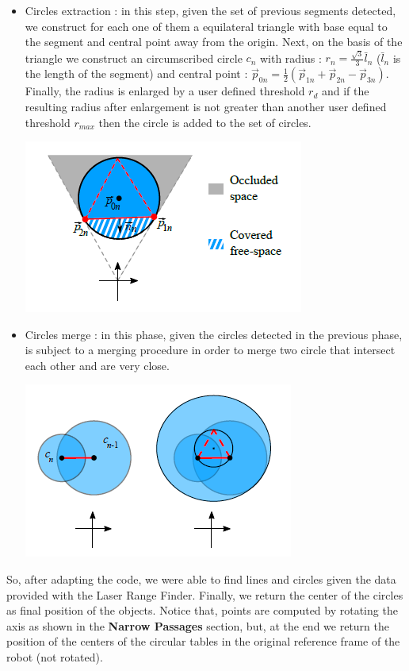 \begin{itemize}
    \item Circles extraction : in this step, given the set of previous segments detected, we construct for each one of them a equilateral triangle with base equal to the segment and central point away from the origin. Next, on the basis of the triangle we construct an circumscribed circle \(c_{n}\) with radius : \(r_{n} = \frac{\sqrt{3}}{3} \bar{l}_{n}\) (\(\bar{l}_{n}\) is the length of the segment) and central point : \(\vec{p}_{0n} = \frac{1}{2} (\vec{p}_{1n} + \vec{p}_{2n} - \vec{p}_{3n})\). Finally, the radius is enlarged by a user defined threshold \(r_{d}\) and if the resulting radius after enlargement is not greater than another user defined threshold \(r_{max}\) then the circle is added to the set of circles.
    \begin{center}
        \includegraphics[scale=0.75]{images/detection/circle-extraction.png}    
    \end{center}  
    \item Circles merge : in this phase, given the circles detected in the previous phase, is subject to a merging procedure in order to merge two circle that intersect each other and are very close.   
    \begin{center}
        \includegraphics[scale=0.75]{images/detection/circle-merging.png}    
    \end{center}  
\end{itemize}
So, after adapting the code, we were able to find lines and circles given the data provided with the Laser Range Finder. 
\newline
Finally, we return the center of the circles as final position of the objects. 
Notice that, points are computed by rotating the axis as shown in the \textbf{Narrow Passages} section, but, at the end we return the position of the centers of the circular tables in the original reference frame of the robot (not rotated).
